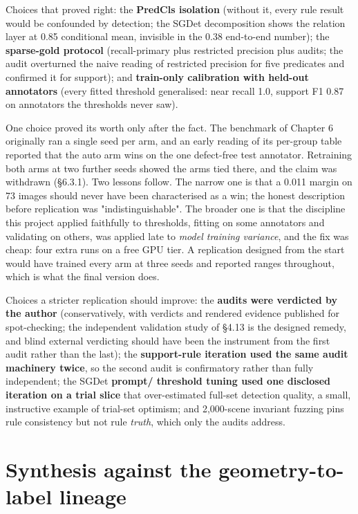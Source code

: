 Choices that proved right: the \textbf{PredCls isolation} (without it, every rule result would be confounded by detection; the SGDet decomposition shows the relation layer at 0.85 conditional mean, invisible in the 0.38 end-to-end number); the \textbf{sparse-gold protocol} (recall-primary plus restricted precision plus audits; the audit overturned the naive reading of restricted precision for five predicates and confirmed it for support); and \textbf{train-only calibration with held-out annotators} (every fitted threshold generalised: near recall 1.0, support F1 0.87 on annotators the thresholds never saw).

One choice proved its worth only after the fact. The benchmark of Chapter 6 originally ran a single seed per arm, and an early reading of its per-group table reported that the auto arm wins on the one defect-free test annotator. Retraining both arms at two further seeds showed the arms tied there, and the claim was withdrawn (\S6.3.1). Two lessons follow. The narrow one is that a 0.011 margin on 73 images should never have been characterised as a win; the honest description before replication was "indistinguishable". The broader one is that the discipline this project applied faithfully to thresholds, fitting on some annotators and validating on others, was applied late to \textit{model training variance}, and the fix was cheap: four extra runs on a free GPU tier. A replication designed from the start would have trained every arm at three seeds and reported ranges throughout, which is what the final version does.

Choices a stricter replication should improve: the \textbf{audits were verdicted by the author} (conservatively, with verdicts and rendered evidence published for spot-checking; the independent validation study of \S4.13 is the designed remedy, and blind external verdicting should have been the instrument from the first audit rather than the last); the \textbf{support-rule iteration used the same audit machinery twice}, so the second audit is confirmatory rather than fully independent; the SGDet \textbf{prompt/ threshold tuning used one disclosed iteration on a trial slice} that over-estimated full-set detection quality, a small, instructive example of trial-set optimism; and 2,000-scene invariant fuzzing pins rule consistency but not rule \textit{truth}, which only the audits address.

\section{Synthesis against the geometry-to-label lineage}

